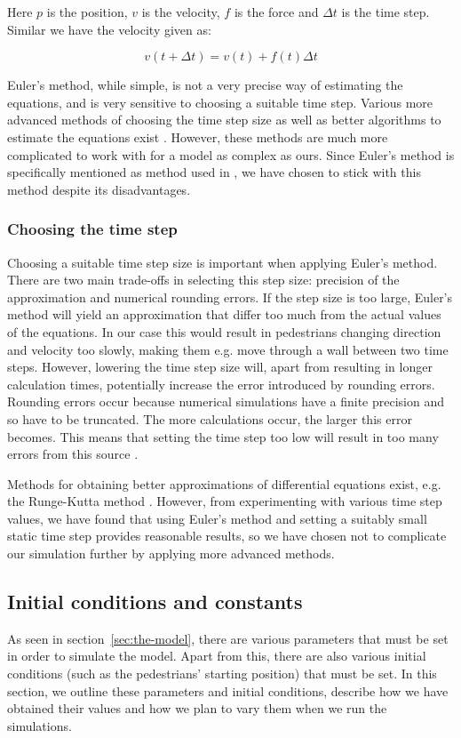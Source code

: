 Here $p$ is the position, $v$ is the velocity, $f$ is the force and $\Delta t$ 
is the time step. Similar we have the velocity given as:

\begin{equation}
    v(t+\Delta t)=v(t)+f(t)\Delta t
\end{equation}    

Euler's method, while simple, is not a very precise way of estimating the 
equations, and is very sensitive to choosing a suitable time step. Various 
more advanced methods of choosing the time step size as well as better 
algorithms to estimate the equations exist \cite{MD}. However, these methods 
are much more complicated to work with for a model as complex as ours. Since 
Euler's method is specifically mentioned as method used in \cite{ABconstant}, 
we have chosen to stick with this method despite its disadvantages.

\subsubsection{Choosing the time step}
\label{sec:choosing-timestep}
Choosing a suitable time step size is important when applying Euler's method.  
There are two main trade-offs in selecting this step size: precision of the 
approximation and numerical rounding errors. If the step size is too large, 
Euler's method will yield an approximation that differ too much from the 
actual values of the equations. In our case this would result in pedestrians 
changing direction and velocity too slowly, making them e.g. move through a 
wall between two time steps. However, lowering the time step size will, apart 
from resulting in longer calculation times, potentially increase the error 
introduced by rounding errors. Rounding errors occur because numerical 
simulations have a finite precision and so have to be truncated. The more 
calculations occur, the larger this error becomes. This means that setting the 
time step too low will result in too many errors from this source \cite{RoundingError}.

Methods for obtaining better approximations of differential equations exist, 
e.g. the Runge-Kutta method \cite{butcher2003}. However, from experimenting 
with various time step values, we have found that using Euler's method and 
setting a suitably small static time step provides reasonable results, so we 
have chosen not to complicate our simulation further by applying more advanced 
methods.

\subsection{Initial conditions and constants}
\label{sec:init-cond}
As seen in section~\ref{sec:the-model}, there are various parameters that must 
be set in order to simulate the model. Apart from this, there are also various 
initial conditions (such as the pedestrians' starting position) that must be 
set. In this section, we outline these parameters and initial conditions, 
describe how we have obtained their values and how we plan to vary them 
when we run the simulations.

